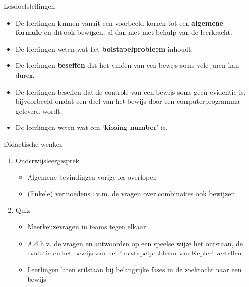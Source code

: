 \documentclass[dutch]{beamer}
\begin{document}
\begin{frame}{Lesdoelstellingen}
\begin{itemize}
\item De leerlingen kunnen vanuit een voorbeeld komen tot een \textbf{algemene formule} en dit ook bewijzen, al dan niet met behulp van de leerkracht.
\item De leerlingen weten wat het \textbf{bolstapelprobleem} inhoudt.
\item De leerlingen \textbf{beseffen} dat het vinden van een bewijs soms vele jaren kan duren.
\item De leerlingen beseffen dat de controle van een bewijs soms geen evidentie is, bijvoorbeeld omdat een deel van het bewijs door een computerprogramma geleverd wordt.
\item De leerlingen weten wat een \textquoteleft \textbf{kissing number}' is.
\end{itemize}
\end{frame}

\begin{frame}{Didactische wenken}

\begin{enumerate}
	\item Onderwijsleergesprek
	\begin{itemize}
	\item Algemene bevindingen vorige les overlopen
	\item (Enkele) vermoedens i.v.m. de vragen over combinaties ook bewijzen
\end{itemize}
	\item{Quiz}
	\begin{itemize}
	\item Meerkeuzevragen in teams tegen elkaar
	\item A.d.h.v. de vragen en antwoorden op een speelse wijze het ontstaan, de evolutie en het bewijs van het \textquoteleft bolstapelprobleem van Kepler' vertellen
	\item Leerlingen laten stilstaan bij belangrijke fases in de zoektocht naar een bewijs
\end{itemize}
\end{enumerate}

\end{frame}



\end{document}
